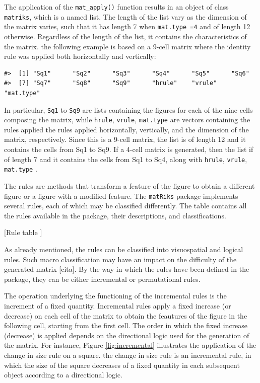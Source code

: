 The application of the \texttt{mat\_apply()} function results in an object of class \texttt{matriks}, which is a named list. The length of the list vary as the dimension of the matrix varies, such that it has length 7 when \texttt{mat.type\ =4} and of length 12 otherwise. Regardless of the length of the list, it contains the characteristics of the matrix. the following example is based on a 9-cell matrix where the identity rule was applied both horizontally and vertically:

\begin{verbatim}
#>  [1] "Sq1"      "Sq2"      "Sq3"      "Sq4"      "Sq5"      "Sq6"     
#>  [7] "Sq7"      "Sq8"      "Sq9"      "hrule"    "vrule"    "mat.type"
\end{verbatim}

In particular, \texttt{Sq1} to \texttt{Sq9} are lists containing the figures for each of the nine cells composing the matrix, while \texttt{hrule}, \texttt{vrule}, \texttt{mat.type} are vectors containing the rules applied the rules applied horizontally, vertically, and the dimension of the matrix, respectively. Since this is a 9-cell matrix, the list is of length 12 and it contains the cells from Sq1 to Sq9. If a 4-cell matrix is generated, then the list if of length 7 and it contains the cells from Sq1 to Sq4, along with \texttt{hrule}, \texttt{vrule}, \texttt{mat.type} .

The rules are methods that transform a feature of the figure to obtain a different figure or a figure with a modified feature.
The \texttt{matRiks} package implements several rules, each of which may be classified differently.
The table contains all the rules available in the package, their descriptions, and classifications.

{[}Rule table {]}

As already mentioned, the rules can be classified into visuospatial and logical rules.
Such macro classification may have an impact on the difficulty of the generated matrix {[}cita{]}.
By the way in which the rules have been defined in the  package, they can be either incremental or permutational rules.

The operation underlying the functioning of the incremental rules is the increment of a fixed quantity.
Incremental rules apply a fixed increase (or decrease) on each cell of the matrix to obtain the feautures of the figure in the following cell, starting from the first cell.
The order in which the fixed increase (decrease) is applied depends on the directional logic used for the generation of the matrix.
For instance, Figure \ref{fig:incremental} illustrates the application of the change in size rule on a square. the change in size rule is an incremental rule, in which the size of the square decreases of a fixed quantity in each subsequent object according to a directional logic.

